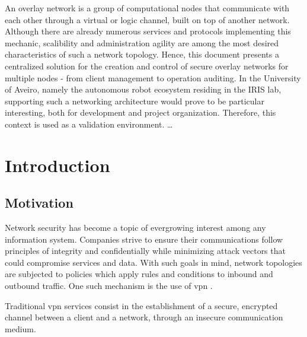 \documentclass[11pt,twoside,a4paper]{report}
\begin{document}
\TitlePage
  \vspace*{55mm}
       {An overlay network is a group of computational nodes that communicate with each other through a virtual or logic channel, built on top of another network. Although there are already numerous services and protocols implementing this mechanic, scalibility and administration agility are among the most desired characteristics of such a network topology. Hence, this document presents a centralized solution for the creation and control of secure overlay networks for multiple nodes - from client management to operation auditing. In the University of Aveiro, namely the autonomous robot ecosystem residing in the IRIS lab, supporting such a networking architecture would prove to be particular interesting, both for development and project organization. Therefore, this context is used as a validation environment.  \ldots}
\EndTitlePage
\titlepage\ \endtitlepage %


%
%
\tableofcontents

\cleardoublepage
\listoffigures

\cleardoublepage
\listoftables

\cleardoublepage
\printglossary


\cleardoublepage
{}
\chapter{Introduction}

\section{Motivation}

Network security has become a topic of evergrowing interest among any information system. Companies strive to ensure their communications follow principles of integrity and confidentially while minimizing attack vectors that could compromise services and data. With such goals in mind, network topologies are subjected to policies which apply rules and conditions to inbound and outbound traffic. One such mechanism is the use of \acrfull{vpn} .

Traditional \acrshort{vpn} services consist in the establishment of a secure, encrypted channel between a client and a network, through an insecure communication medium.
\end{document}
